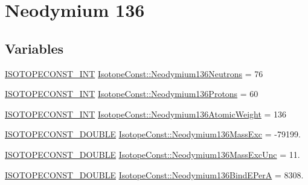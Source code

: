 \hypertarget{group___isotope_const-_neodymium-_nd136}{}\section{Neodymium 136}
\label{group___isotope_const-_neodymium-_nd136}
\subsection*{Variables}
\begin{DoxyCompactItemize}
\item 
\mbox{\hyperlink{group___isotope_const-_macros_ga5f18360b3e99483a35c32d789e62621c}{I\+S\+O\+T\+O\+P\+E\+C\+O\+N\+S\+T\+\_\+\+I\+NT}} \mbox{\hyperlink{group___isotope_const-_neodymium-_nd136_ga895ad931948d568a7f33fa6a243c866d}{Isotope\+Const\+::\+Neodymium136\+Neutrons}} = 76
\item 
\mbox{\hyperlink{group___isotope_const-_macros_ga5f18360b3e99483a35c32d789e62621c}{I\+S\+O\+T\+O\+P\+E\+C\+O\+N\+S\+T\+\_\+\+I\+NT}} \mbox{\hyperlink{group___isotope_const-_neodymium-_nd136_ga77e343b19520be2f8f86f2286bacfc56}{Isotope\+Const\+::\+Neodymium136\+Protons}} = 60
\item 
\mbox{\hyperlink{group___isotope_const-_macros_ga5f18360b3e99483a35c32d789e62621c}{I\+S\+O\+T\+O\+P\+E\+C\+O\+N\+S\+T\+\_\+\+I\+NT}} \mbox{\hyperlink{group___isotope_const-_neodymium-_nd136_gae6296beef6725fde58b57c75c3df08be}{Isotope\+Const\+::\+Neodymium136\+Atomic\+Weight}} = 136
\item 
\mbox{\hyperlink{group___isotope_const-_macros_ga8f45a7272ce02c0b4c65c44636ed719a}{I\+S\+O\+T\+O\+P\+E\+C\+O\+N\+S\+T\+\_\+\+D\+O\+U\+B\+LE}} \mbox{\hyperlink{group___isotope_const-_neodymium-_nd136_gaf16fbad8663818fea0d30bf981cc4713}{Isotope\+Const\+::\+Neodymium136\+Mass\+Exc}} = -\/79199.
\item 
\mbox{\hyperlink{group___isotope_const-_macros_ga8f45a7272ce02c0b4c65c44636ed719a}{I\+S\+O\+T\+O\+P\+E\+C\+O\+N\+S\+T\+\_\+\+D\+O\+U\+B\+LE}} \mbox{\hyperlink{group___isotope_const-_neodymium-_nd136_ga53efbf392f6378a031e6331f5518c862}{Isotope\+Const\+::\+Neodymium136\+Mass\+Exc\+Unc}} = 11.
\item 
\mbox{\hyperlink{group___isotope_const-_macros_ga8f45a7272ce02c0b4c65c44636ed719a}{I\+S\+O\+T\+O\+P\+E\+C\+O\+N\+S\+T\+\_\+\+D\+O\+U\+B\+LE}} \mbox{\hyperlink{group___isotope_const-_neodymium-_nd136_ga6136611a820f083190bcb501824e2e09}{Isotope\+Const\+::\+Neodymium136\+Bind\+E\+PerA}} = 8308.
\item 

\end{DoxyCompactItemize}
